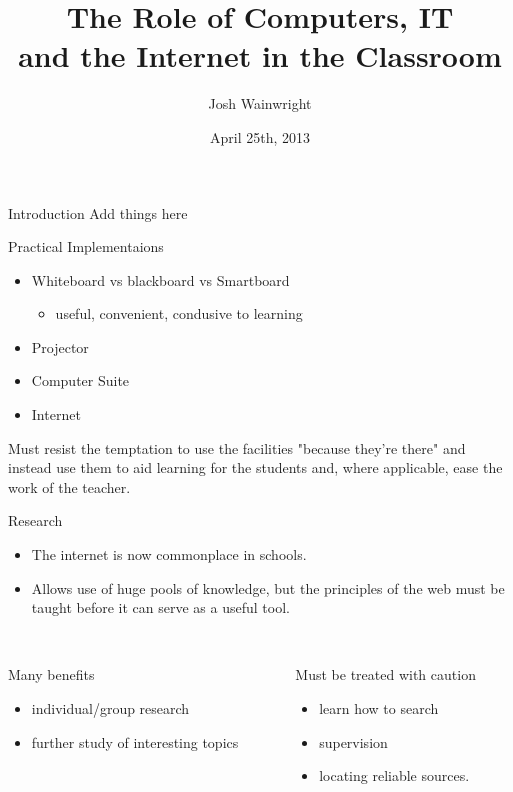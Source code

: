 \documentclass{beamer}
\title[Role of IT in the Classroom]{The Role of Computers, IT\\and the Internet in the Classroom}
\author{Josh Wainwright}
\institute{Math-linux.com}
\date{April 25th, 2013}
\begin{document}
\begin{frame}
\titlepage
\end{frame}


\begin{frame}{Introduction}
    Add things here
\end{frame}

\begin{frame}{Practical Implementaions}
    \begin{itemize}
        \item Whiteboard vs blackboard vs Smartboard
        \begin{itemize}
            \item useful, convenient, condusive to learning
        \end{itemize}
        \item Projector
        \item Computer Suite
        \item Internet
    \end{itemize}
    Must resist the temptation to use the facilities "because they're there" and instead use them to aid learning for the students and, where applicable, ease the work of the teacher.
\end{frame}

\begin{frame}{Research}
    \begin{itemize}
        \item The internet is now commonplace in schools.
        \item Allows use of huge pools of knowledge, but the principles of the web must be taught before it can serve as a useful tool.\\~\\
    \end{itemize}
    \begin{columns}
           \begin{column}[l]{5cm}
            Many benefits
            \begin{itemize}
                \item individual/group research
                \item further study of interesting topics
            \end{itemize}
        \end{column}
        \begin{column}[r]{5cm}
            Must be treated with caution
            \begin{itemize}
                \item learn how to search
                \item supervision
                \item locating reliable sources.
            \end{itemize}
        \end{column}
    \end{columns}
\end{frame}
\end{document}
